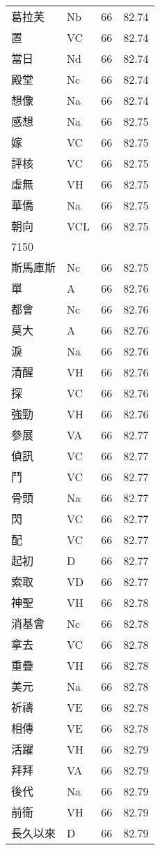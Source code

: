 \documentclass[twocolumn]{book}
\begin{document}
\begin{supertabular}{llrr}
葛拉芙 & Nb & 66 &  82.74\\
置 & VC & 66 &  82.74\\
當日 & Nd & 66 &  82.74\\
殿堂 & Nc & 66 &  82.74\\
想像 & Na & 66 &  82.74\\
感想 & Na & 66 &  82.75\\
嫁 & VC & 66 &  82.75\\
評核 & VC & 66 &  82.75\\
虛無 & VH & 66 &  82.75\\
華僑 & Na & 66 &  82.75\\
朝向 & VCL & 66 &  82.75\\
7150\\
斯馬庫斯 & Nc & 66 &  82.75\\
單 & A & 66 &  82.76\\
都會 & Nc & 66 &  82.76\\
莫大 & A & 66 &  82.76\\
淚 & Na & 66 &  82.76\\
清醒 & VH & 66 &  82.76\\
探 & VC & 66 &  82.76\\
強勁 & VH & 66 &  82.76\\
參展 & VA & 66 &  82.77\\
偵訊 & VC & 66 &  82.77\\
鬥 & VC & 66 &  82.77\\
骨頭 & Na & 66 &  82.77\\
閃 & VC & 66 &  82.77\\
配 & VC & 66 &  82.77\\
起初 & D & 66 &  82.77\\
索取 & VD & 66 &  82.77\\
神聖 & VH & 66 &  82.78\\
消基會 & Nc & 66 &  82.78\\
拿去 & VC & 66 &  82.78\\
重疊 & VH & 66 &  82.78\\
美元 & Na & 66 &  82.78\\
祈禱 & VE & 66 &  82.78\\
相傳 & VE & 66 &  82.78\\
活躍 & VH & 66 &  82.79\\
拜拜 & VA & 66 &  82.79\\
後代 & Na & 66 &  82.79\\
前衛 & VH & 66 &  82.79\\
長久以來 & D & 66 &  82.79\\

\end{supertabular}
\end{document}
